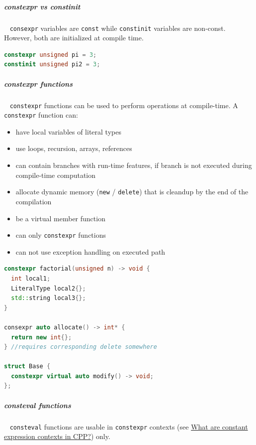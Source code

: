 \documentclass[11pt,twoside,landscape]{article}
\begin{document}
\begin{multicols}{2}
\subparagraph{constexpr vs constinit} \
\label{sec:orgc195e5d}
\texttt{consexpr} variables are \texttt{const} while \texttt{constinit} variables are non-const.
However, both are initialized at compile time.

\begin{lstlisting}[language=c++,label=lst:constexpr-and-constinit-initialization,caption={constexpr and constinit initialization},captionpos=b,numbers=none]
constexpr unsigned pi = 3;
constinit unsigned pi2 = 3;
\end{lstlisting}

\subparagraph{constexpr functions} \
\label{sec:orgb9c81a6}
\texttt{constexpr} functions can be used to perform operations at compile-time.
A \texttt{constexpr} function can:
\begin{itemize}
\item have local variables of literal types
\item use loops, recursion, arrays, references
\item can contain branches with run-time features, if branch is not executed during compile-time computation
\item allocate dynamic memory (\texttt{new} / \texttt{delete}) that is cleandup by the end of the compilation
\item be a virtual member function
\item can only \texttt{constexpr} functions
\item can not use exception handling on executed path
\end{itemize}


\begin{lstlisting}[language=c++,label=lst:examples-for-constexpr-function-usage,caption={Examples for constexpr function usage},captionpos=b,numbers=none]
constexpr factorial(unsigned n) -> void {
  int local1;
  LiteralType local2{};
  std::string local3{};
}

consexpr auto allocate() -> int* {
  return new int{};
} //requires corresponding delete somewhere

struct Base {
  constexpr virtual auto modify() -> void;
};
\end{lstlisting}

\subparagraph{consteval functions} \
\label{sec:org8647539}
\texttt{consteval} functions are usable in \texttt{constexpr} contexts (see \href{../../../roam/20230629094857-what_are_constant_expression_contexts_in_cpp.org}{What are constant expression contexts in CPP?}) only.


\end{multicols}
\end{document}
